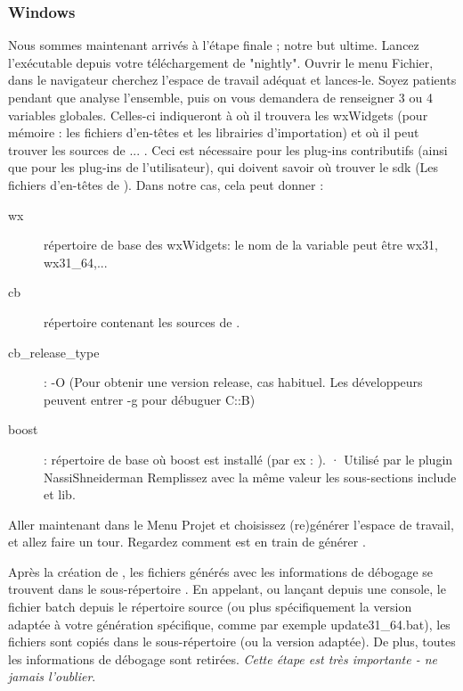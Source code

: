 \subsubsection{Windows}

Nous sommes maintenant arrivés à l'étape finale ; notre but ultime. Lancez l'exécutable \codeblocks depuis votre téléchargement de "nightly". Ouvrir le menu Fichier, dans le navigateur cherchez l'espace de travail adéquat et lances-le. Soyez patients pendant que \codeblocks analyse l'ensemble, puis on vous demandera de renseigner 3 ou 4 variables globales. Celles-ci indiqueront à \codeblocks où il trouvera les wxWidgets (pour mémoire : les fichiers d'en-têtes et les librairies d'importation) et où il peut trouver les sources de ... \codeblocks. Ceci est nécessaire pour les plug-ins contributifs (ainsi que pour les plug-ins de l'utilisateur), qui doivent savoir où trouver le sdk (Les fichiers d'en-têtes de \codeblocks). Dans notre cas, cela peut donner :
\begin{description}
\item[wx]  répertoire de base des wxWidgets: le nom de la variable peut être wx31, wx31\_64,...
\item[cb]  répertoire contenant les sources de \codeblocks.
\item[cb\_release\_type] : -O (Pour obtenir une version release, cas habituel.
         Les développeurs peuvent entrer -g pour débuguer C::B)
\item[boost] : répertoire de base où boost est installé (par ex : ).
·         Utilisé par le plugin NassiShneiderman
          Remplissez avec la même valeur les sous-sections include et lib.
\end{description}

Aller maintenant dans le Menu Projet et choisissez (re)générer l'espace de travail, et allez faire un tour. Regardez comment \codeblocks est en train de générer \codeblocks.

Après la création de \codeblocks, les fichiers générés avec les informations de débogage se trouvent dans le sous-répertoire . En appelant, ou lançant depuis une console, le fichier batch  depuis le répertoire source  (ou plus spécifiquement la version adaptée à votre génération spécifique, comme par exemple update31\_64.bat), les fichiers sont copiés dans le sous-répertoire  (ou la version adaptée). De plus, toutes les informations de débogage sont retirées. \textit{Cette étape est très importante - ne jamais l'oublier}.


